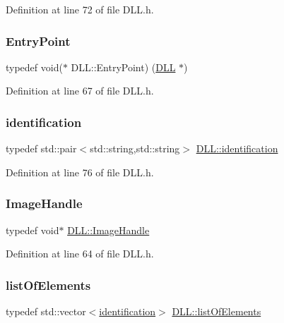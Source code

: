 Definition at line 72 of file D\+L\+L.\+h.

\mbox{\label{classDLL_a6d72472c2f54dc82cbb6a5bbab70dae6}} 
\subsubsection{\texorpdfstring{Entry\+Point}{EntryPoint}}
{\footnotesize\ttfamily typedef void($\ast$ D\+L\+L\+::\+Entry\+Point) (\hyperlink{classDLL}{D\+LL} $\ast$)}



Definition at line 67 of file D\+L\+L.\+h.

\mbox{\label{classDLL_aa2df9e9226052bfa93a6df56f1ca689b}} 
\subsubsection{\texorpdfstring{identification}{identification}}
{\footnotesize\ttfamily typedef std\+::pair$<$std\+::string,std\+::string$>$ \hyperlink{classDLL_aa2df9e9226052bfa93a6df56f1ca689b}{D\+L\+L\+::identification}}



Definition at line 76 of file D\+L\+L.\+h.

\mbox{\label{classDLL_addaefe5c907a5f357cc18718300f22b0}} 
\subsubsection{\texorpdfstring{Image\+Handle}{ImageHandle}}
{\footnotesize\ttfamily typedef void$\ast$ \hyperlink{classDLL_addaefe5c907a5f357cc18718300f22b0}{D\+L\+L\+::\+Image\+Handle}}



Definition at line 64 of file D\+L\+L.\+h.

\mbox{\label{classDLL_a36792635c3cd36adbaaef2ff7152046e}} 
\subsubsection{\texorpdfstring{list\+Of\+Elements}{listOfElements}}
{\footnotesize\ttfamily typedef std\+::vector$<$\hyperlink{classDLL_aa2df9e9226052bfa93a6df56f1ca689b}{identification}$>$ \hyperlink{classDLL_a36792635c3cd36adbaaef2ff7152046e}{D\+L\+L\+::list\+Of\+Elements}}



